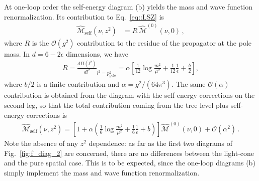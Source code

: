 At one-loop order the self-energy diagram (b) yields the mass and wave function
renormalization. Its contribution to Eq.~\eqref{eq::LSZ} is  
\begin{align}
        \widehat{\mathcal{M}}_{\text{self}}\left(\nu,z^2\right) 
        &=  R\, \widehat{\mathcal{M}}^{(0)}\left(\nu, 0\right)\, ,
\end{align}
where $R$ is the $\mathcal{O}\left(g^2\right)$ contribution to the residue of the propagator at the pole mass. In $d = 6 -2\epsilon$ dimensions, we have
\begin{align}
        R = {\frac{d\Pi\left(l^2\right)}{dl^2}}_{l^2=p^2_{\text{pole}}} 
        = \alpha\left[\frac{1}{12}\log\frac{m^2}{\mu^2} + \frac{1}{12}\frac{1}{\epsilon} + \frac{b}{2}\right],
\end{align}
where $b/2$ is a finite contribution and $\alpha=g^2 /(64\pi^3) $. The same
$\mathcal{O}\left(\alpha\right)$ contribution is obtained from the diagram with
the self energy corrections on the second leg, so that the total contribution
coming from the tree level plus self-energy corrections is 
\begin{align}\label{eq::zmzphi}
        \widehat{\mathcal{M}}_{\text{self}}\left(\nu,z^2\right)=\left[1+ \alpha\left(\frac{1}{6}\log\frac{m^2}{\mu^2} 
        + \frac{1}{6}\frac{1}{\epsilon} + b\right) \right]\widehat{\mathcal{M}}^{(0)}\left(\nu, 0\right)
        + \mathcal{O}\left(\alpha^2\right)\, .
\end{align}
Note the absence of any $z^2$ dependence: as far as the first two diagrams of
Fig.~\ref{fig:f_diag_2} are concerned, there are no differences between the light-cone
and the pure spatial case. This is to be expected, since the one-loop diagrams
(b) simply implement the mass and wave function renormalization.

